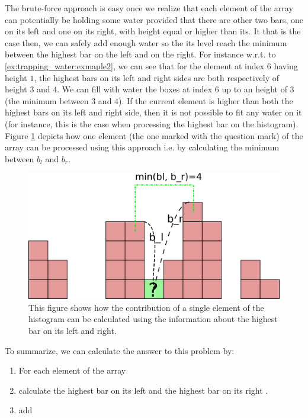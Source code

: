 The brute-force approach is easy once we realize that each element of the array can potentially be holding some water provided that there are other two bars, one on its left and one on its right, with height equal or higher than its. It that is the case then, we can safely add enough water so the its level reach the minimum between the highest bar on the left and on the right.
For instance w.r.t. to \ref{ex:trapping_water:exmaple2}, we can see that for the element at index $6$ having height $1$, the highest bars on its left and right sides are both respectively of height $3$ and $4$. We can fill with water the boxes at index $6$ up to an height of $3$ (the minimum between $3$ and $4$).
If the current element is higher than both the highest bars on its left and right side, then it is not possible to fit any water on it (for instance, this is the case when processing the highest bar on the histogram).  Figure \ref{fig:trapping_water_example3} depicts how one element (the one marked with the question mark) of the array can be processed using this approach i.e. by calculating the minimum between $b_l$ and $b_r$.


\begin{figure}
		\label{fig:trapping_water_example3}
		\centering
		\includegraphics[scale=1.0]{sources/trapping_water/images/example3}
		\caption{This figure shows how the contribution of a single element of the histogram can be calculated using the information about the highest bar on its left and right.}
\end{figure}

To summarize, we can calculate the answer to this problem by:
\begin{enumerate}
	\item For each element of the array 
	\item calculate the highest bar on its left  and the highest bar on its right .
	\item add 
\end{enumerate}


